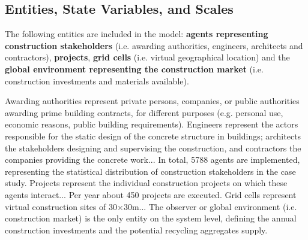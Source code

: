 \documentclass[
  man,
  10pt,
  a4paper,
  floatsintext
]{apa7}
\begin{document}
\subsection{Entities, State Variables, and Scales}

\begin{guidingbox}
  \begin{tcbitemize}
    \item[\gddarkredb{\arrowbullet}] 
    \item[\gddarkcornflowerblueb{\arrowbullet}] 
    \item[\gddarkgreenb{\arrowbullet}] 
    \item[\gddarkpurpleb{\arrowbullet}] 
    \item[\gddarkorangeb{\arrowbullet}] 
  \end{tcbitemize}
\end{guidingbox}


{
  \color{gddarkredb}
  The following entities are included in the model: \textbf{agents representing construction stakeholders} (i.e. awarding authorities, engineers, architects and contractors), \textbf{projects}, \textbf{grid cells} (i.e. virtual geographical location) and the \textbf{global environment representing the construction market} (i.e. construction investments and materials available).

  Awarding authorities represent private persons, companies, or public authorities awarding prime building contracts, for different purposes (e.g. personal use, economic reasons, public building requirements). Engineers represent the actors responsible for the static design of the concrete structure in buildings; architects the stakeholders designing and supervising the construction, and contractors the companies providing the concrete work... In total, 5788 agents are implemented, representing the statistical distribution of construction stakeholders in the case study. Projects represent the individual construction projects on which these agents interact... Per year about 450 projects are executed. Grid cells represent virtual construction sites of 30×30m... The observer or global environment (i.e. construction market) is the only entity on the system level, defining the annual construction investments and the potential recycling aggregates supply.
}
\end{document}
